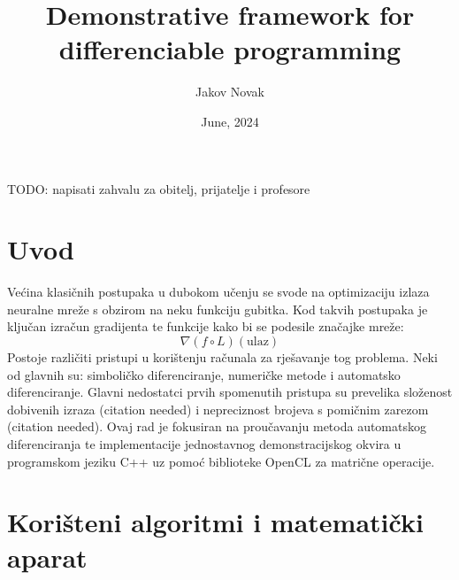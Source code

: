\documentclass[zavrsnirad]{fer}
\title{Demonstrative framework for differenciable programming}
\author{Jakov Novak}
\date{June, 2024}
\begin{document}
\maketitle






\begin{zahvale}
  TODO: napisati zahvalu za obitelj, prijatelje i profesore
\end{zahvale}


\mainmatter


\tableofcontents


\chapter{Uvod}
\label{pog:uvod}

Većina klasičnih postupaka u dubokom učenju se svode na optimizaciju izlaza neuralne mreže s obzirom na neku funkciju gubitka. Kod takvih postupaka je ključan izračun gradijenta te funkcije kako bi se podesile značajke mreže:
\begin{equation}
  \nabla (f \circ L) (\mathrm{ulaz})
\end{equation}
Postoje različiti pristupi u korištenju računala za rješavanje tog problema. Neki od glavnih su: simboličko diferenciranje, numeričke metode i automatsko diferenciranje. Glavni nedostatci prvih spomenutih pristupa su prevelika složenost dobivenih izraza (citation needed) i nepreciznost brojeva s pomičnim zarezom (citation needed). Ovaj rad je fokusiran na proučavanju metoda automatskog diferenciranja te implementacije jednostavnog demonstracijskog okvira u programskom jeziku C++ uz pomoć biblioteke OpenCL za matrične operacije.

\chapter{Korišteni algoritmi i matematički aparat}
\label{pog:teorijski_dio}
\end{document}

